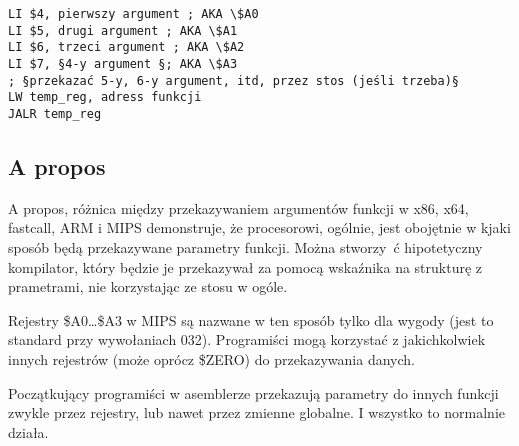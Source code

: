 \begin{lstlisting}[caption=MIPS,style=customasmMIPS]
LI $4, pierwszy argument ; AKA \$A0
LI $5, drugi argument ; AKA \$A1
LI $6, trzeci argument ; AKA \$A2
LI $7, §4-y argument §; AKA \$A3
; §przekazać 5-y, 6-y argument, itd, przez stos (jeśli trzeba)§
LW temp_reg, adress funkcji
JALR temp_reg
\end{lstlisting}

\subsection{A propos}

A propos, różnica między przekazywaniem argumentów funkcji w x86, x64, fastcall, ARM i MIPS demonstruje, że procesorowi, ogólnie, jest obojętnie w kjaki sposób będą 
przekazywane parametry funkcji. Można stworzy ć hipotetyczny kompilator, który będzie je przekazywał za pomocą 
wskaźnika na strukturę z prametrami, nie korzystając ze stosu w ogóle.

Rejestry \$A0\dots \$A3 w MIPS są nazwane w ten sposób tylko dla wygody (jest to standard przy wywołaniach 032).
Programiści mogą korzystać z jakichkolwiek innych rejestrów (może oprócz \$ZERO) do
przekazywania danych.

Początkujący programiści w asemblerze przekazują parametry do innych funkcji
zwykle przez rejestry, lub nawet przez zmienne globalne.
I wszystko to normalnie działa.


